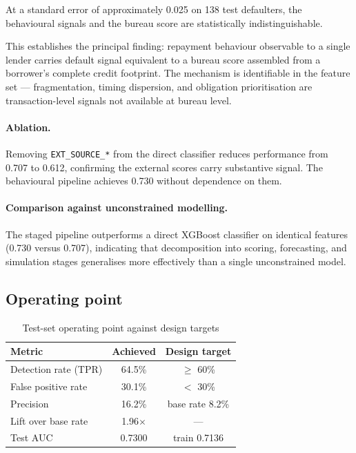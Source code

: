 \documentclass[11pt,a4paper]{article}
\begin{document}
\vspace{6pt}

At a standard error of approximately 0.025 on 138 test defaulters, the behavioural
signals and the bureau score are statistically indistinguishable.

This establishes the principal finding: repayment behaviour observable to a single lender
carries default signal equivalent to a bureau score assembled from a borrower's complete
credit footprint. The mechanism is identifiable in the feature set --- fragmentation,
timing dispersion, and obligation prioritisation are transaction-level signals not
available at bureau level.

\paragraph{Ablation.} Removing \texttt{EXT\_SOURCE\_*} from the direct classifier reduces
performance from 0.707 to 0.612, confirming the external scores carry substantive signal.
The behavioural pipeline achieves 0.730 without dependence on them.

\paragraph{Comparison against unconstrained modelling.} The staged pipeline outperforms a
direct XGBoost classifier on identical features (0.730 versus 0.707), indicating that
decomposition into scoring, forecasting, and simulation stages generalises more
effectively than a single unconstrained model.

\subsection{Operating point}

\begin{table}[H]
\centering
\caption{Test-set operating point against design targets}
\begin{tabular}{lcc}
\toprule
\textbf{Metric} & \textbf{Achieved} & \textbf{Design target} \\
\midrule
Detection rate (TPR) & 64.5\% & $\geq$ 60\% \\
False positive rate & 30.1\% & $<$ 30\% \\
Precision & 16.2\% & base rate 8.2\% \\
Lift over base rate & 1.96$\times$ & --- \\
Test AUC & 0.7300 & train 0.7136 \\
\bottomrule
\end{tabular}
\end{table}
\end{document}
